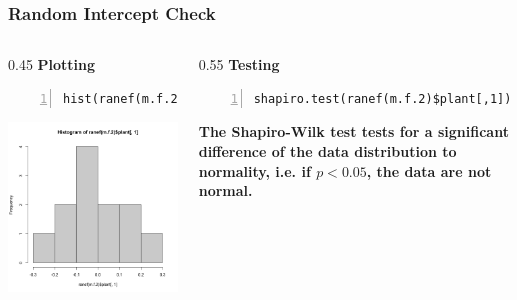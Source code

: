 \documentclass{beamer}
\begin{document}
\begin{frame}[fragile]
    \frametitle{Random Intercept Check}
    \begin{columns}
        \begin{column}{0.45\textwidth}
            \textbf{Plotting}
            \scriptsize
            \begin{Verbatim}[numbers=left,numbersep=6pt,frame=single]
hist(ranef(m.f.2)$plant[,1])
            \end{Verbatim}
            \includegraphics[width=\textwidth]{lectures/day_7_diagnostics_of_mems/figures/unnamed-chunk-14-1.png}
        \end{column}
        \begin{column}{0.55\textwidth}
            \textbf{Testing}
            \scriptsize
            \begin{Verbatim}[numbers=left,numbersep=6pt,frame=single]
shapiro.test(ranef(m.f.2)$plant[,1])
            \end{Verbatim}
            \scalebox{1}{
                
            }
        \vspace{1.45cm}
        
        \normalsize\textbf{
        The Shapiro-Wilk test tests for a significant difference of the data distribution to normality, i.e. if $\mathit{p}<0.05$, the data are not normal.}
        \end{column}
    \end{columns}
\end{frame}
\end{document}
